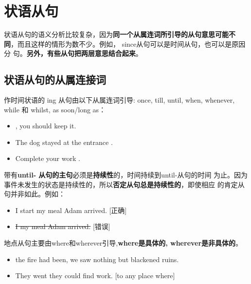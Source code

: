 \chapter{状语从句}

状语从句的语义分析比较复杂，因为\textbf{同一个从属连词所引导的从句意思可能不
  同}，而且这样的情形为数不少。例如， since从句可以是时间从句，也可以是原因分
句。\textbf{另外，有些从句把两层意思结合起来}。

\section{状语从句的从属连接词}


作时间状语的 ing 从句由以下从属连词引导: once, till, until, when, whenever,
while 和 whilst, as soon/long as：
\begin{itemize}
\item {}, you should keep it.
\item The dog stayed at the entrance .
\item Complete your work .
\end{itemize}

带有\textbf{until- 从句的主句}必须是\textbf{持续性}的，时间持续到until-从句的时间
为止。因为事件未发生的状态是持续性的，所以\textbf{否定从句总是持续性的}，即使相应
的肯定从句并非如此。例如：
\begin{itemize}
\item I  start my meal  Adam arrived. [正确]
\item \sout{I  my meal  Adam arrived.} [错误]
\end{itemize}


地点从句主要由where和wherever引导,\textbf{where是具体的, wherever是非具体的}。
\begin{itemize}
\item {} the fire had been, we saw nothing but blackened ruins.

\item They went  they could find work. [to any place where]
\end{itemize}




